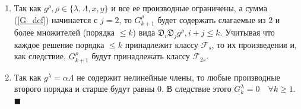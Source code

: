 \begin{enumerate}
\begin{equation}
G_k^\rho = \sum_{j=2}^{k} \frac{\mathcal{L}_k^{(j)} g^\rho }{j!}, \quad k \ge 2,
\label{G_def}
\end{equation}
$$G_1^\rho \equiv 0,$$
$$g^\rho(\lambda,\Lambda,x,y) = g^\rho(\lambda_0,\Lambda_0,x_0,y_0) + \sum_{k=1}^{\infty} \varepsilon^k \mathfrak{D}_k g^\rho + \sum_{k=2}^{+\infty} \varepsilon^k G_k^\rho.$$

\item Так как $g^\rho, \rho \in \{\lambda, \Lambda, x, y\}$ и все ее производные ограничены, а сумма (\ref{G_def}) начинается с $j=2$, то $G_{k+1}^\rho$ будет содержать слагаемые из 2 и более множителей (порядка $\le k$) вида $\mathfrak{D}_i \mathfrak{D}_j g^\rho, i+j \leq k$. Учитывая что каждое решение порядка $\le k$ принадлежит классу $\mathcal{F}_s$, то их произведения и, как следствие, $G_{k+1}^\rho$ будут принадлежать классу $\mathcal{F}_{2s}$.

\item Так как $g^\lambda = \alpha \Lambda$ не содержит нелинейные члены, то любые производные второго порядка и старше будут равны 0. В следствие этого $G_k^\lambda = 0 \quad \forall k \ge 1$. $\blacksquare$
\end{enumerate}






